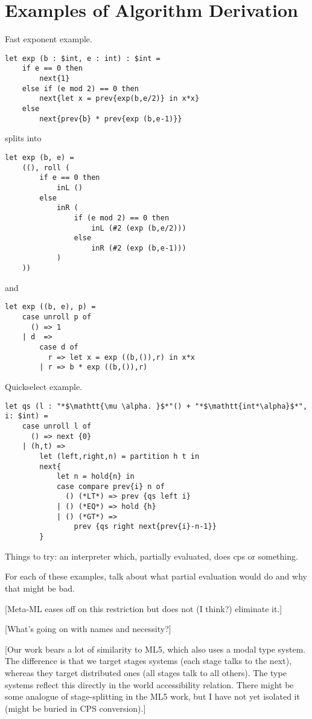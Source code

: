 

\section{Examples of Algorithm Derivation}

Fast exponent example.  

\begin{lstlisting} 
let exp (b : $int, e : int) : $int =
	if e == 0 then
		next{1}
	else if (e mod 2) == 0 then
		next{let x = prev{exp(b,e/2)} in x*x}
	else
		next{prev{b} * prev{exp (b,e-1)}}		
\end{lstlisting}

splits into

\begin{lstlisting} 
let exp (b, e) =
	((), roll (
		if e == 0 then
			inL ()
		else 
			inR (
				if (e mod 2) == 0 then
					inL (#2 (exp (b,e/2)))
				else
					inR (#2 (exp (b,e-1)))
			)
	))
\end{lstlisting}

and

\begin{lstlisting} 
let exp ((b, e), p) =
	case unroll p of
	  () => 1
	| d  =>
		case d of
		  r => let x = exp ((b,()),r) in x*x
		| r => b * exp ((b,()),r)
\end{lstlisting}

Quickselect example.

\begin{lstlisting} 
let qs (l : "*$\mathtt{\mu \alpha. }$*"() + "*$\mathtt{int*\alpha}$*", i: $int) = 
	case unroll l of
	  () => next {0}
	| (h,t) => 
		let (left,right,n) = partition h t in
		next{
			let n = hold{n} in
			case compare prev{i} n of
			  () (*LT*) => prev {qs left i}
			| () (*EQ*) => hold {h}
			| () (*GT*) => 
				prev {qs right next{prev{i}-n-1}}
		}	
\end{lstlisting}

Things to try: an interpreter which, partially evaluated, does cps or something.

For each of these examples, talk about what partial evaluation would do and why that might be bad.


[Meta-ML eases off on this restriction but does not (I think?) eliminate it.]

[What's going on with names and necessity?]

[Our work bears a lot of similarity to ML5, which also uses a modal type system.  The difference is that we target stages systems (each stage talks to the next), whereas they target distributed ones (all stages talk to all others). The type systems reflect this directly in the world accessibility relation.  There might be some analogue of stage-splitting in the ML5 work, but I have not yet isolated it (might be buried in CPS conversion).]

